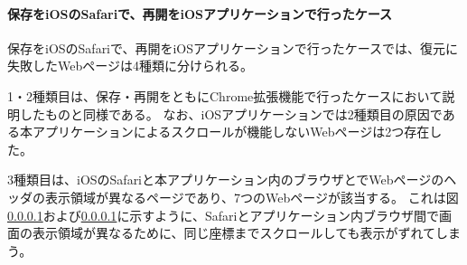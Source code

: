 \paragraph{保存をiOSのSafariで、再開をiOSアプリケーションで行ったケース}

保存をiOSのSafariで、再開をiOSアプリケーションで行ったケースでは、復元に失敗したWebページは4種類に分けられる。

1・2種類目は、保存・再開をともにChrome拡張機能で行ったケースにおいて説明したものと同様である。
なお、iOSアプリケーションでは2種類目の原因である本アプリケーションによるスクロールが機能しないWebページは2つ存在した。

3種類目は、iOSのSafariと本アプリケーション内のブラウザとでWebページのヘッダの表示領域が異なるページであり、7つのWebページが該当する。
これは図\ref{}および\ref{}に示すように、Safariとアプリケーション内ブラウザ間で画面の表示領域が異なるために、同じ座標までスクロールしても表示がずれてしまう。

